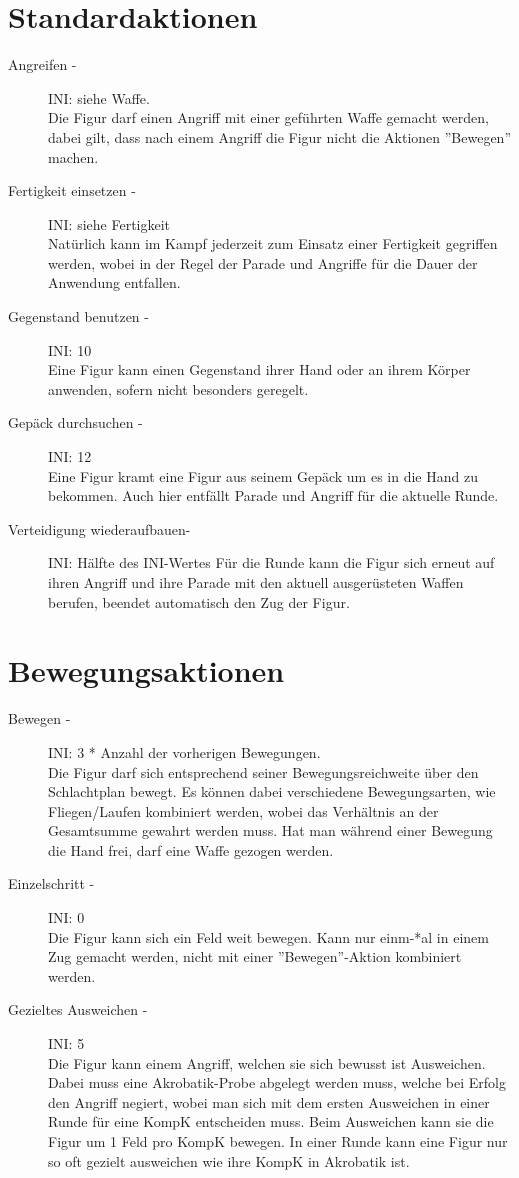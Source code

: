 \documentclass[a4paper,12pt,oneside]{book}
\begin{document}
\section{Standardaktionen}
\begin{description}
\item[Angreifen -] INI: siehe Waffe.
\\Die Figur darf einen Angriff mit einer geführten Waffe gemacht werden, dabei gilt, dass nach einem Angriff die Figur nicht die Aktionen ''Bewegen'' machen.
\item[Fertigkeit einsetzen -] INI: siehe Fertigkeit
\\Natürlich kann im Kampf jederzeit zum Einsatz einer Fertigkeit gegriffen werden, wobei in der Regel der Parade und Angriffe für die Dauer der Anwendung entfallen.
\item[Gegenstand benutzen -] INI: 10
\\Eine Figur kann einen Gegenstand ihrer Hand oder an ihrem Körper anwenden, sofern nicht besonders geregelt.
\item[Gepäck durchsuchen -] INI: 12
\\Eine Figur kramt eine Figur aus seinem Gepäck um es in die Hand zu bekommen. Auch hier entfällt Parade und Angriff für die aktuelle Runde.
\item[Verteidigung wiederaufbauen-] INI: Hälfte des INI-Wertes
Für die Runde kann die Figur sich erneut auf ihren Angriff und ihre Parade mit den aktuell ausgerüsteten Waffen berufen, beendet automatisch den Zug der Figur.
\end{description}

\section{Bewegungsaktionen}
\begin{description}
\item[Bewegen -] INI: 3 * Anzahl der vorherigen Bewegungen.
\\Die Figur darf sich entsprechend seiner Bewegungsreichweite über den Schlachtplan bewegt. Es können dabei verschiedene Bewegungsarten, wie Fliegen/Laufen kombiniert werden, wobei das Verhältnis an der Gesamtsumme gewahrt werden muss. Hat man während einer Bewegung die Hand frei, darf eine Waffe gezogen werden.
\item[Einzelschritt -] INI: 0
\\Die Figur kann sich ein Feld weit bewegen. Kann nur einm-*al in einem Zug gemacht werden, nicht mit einer ''Bewegen''-Aktion kombiniert werden.
\item[Gezieltes Ausweichen -] INI: 5
\\Die Figur kann einem Angriff, welchen sie sich bewusst ist Ausweichen. Dabei muss eine Akrobatik-Probe abgelegt werden muss, welche bei Erfolg den Angriff negiert, wobei man sich mit dem ersten Ausweichen in einer Runde für eine KompK entscheiden muss. Beim Ausweichen kann sie die Figur um 1 Feld pro KompK bewegen. In einer Runde kann eine Figur nur so oft gezielt ausweichen wie ihre KompK in Akrobatik ist.

\end{description}
\end{document}

